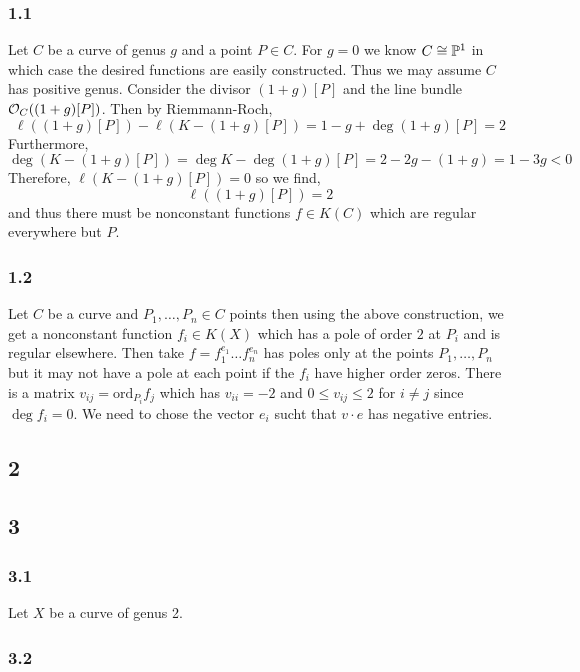 \documentclass[12pt]{article}
\begin{document}
\subsubsection{1.1}

Let $C$ be a curve of genus $g$ and a point $P \in C$. For $g = 0$ we know $C \cong \P^1$ in which case the desired functions are easily constructed. Thus we may assume $C$ has positive genus. Consider the divisor $(1 + g)[P]$ and the line bundle $\struct{C}((1 + g)[P])$. Then by Riemmann-Roch,
\[ \ell((1 + g)[P]) - \ell(K - (1 + g)[P]) = 1 - g + \deg{(1 + g) [P]} = 2 \]
Furthermore,
\[ \deg{(K - (1+g)[P])} = \deg{K} - \deg{(1 + g)[P]} = 2 - 2g - (1 + g) = 1 - 3 g < 0 \]
Therefore, $\ell(K - (1 + g)[P]) = 0$ so we find,
\[ \ell((1 + g)[P]) = 2 \]
and thus there must be nonconstant functions $f \in K(C)$ which are regular everywhere but $P$. 

\subsubsection{1.2}

Let $C$ be a curve and $P_1, \dots, P_n \in C$ points then using the above construction, we get a nonconstant function $f_i \in K(X)$ which has a pole of order $2$ at $P_i$ and is regular elsewhere. Then take $f = f_1^{e_1} \dots f_n^{e_n}$ has poles only at the points $P_1, \dots, P_n$ but it may not have a pole at each point if the $f_i$ have higher order zeros. There is a matrix $v_{ij} = \mathrm{ord}_{P_i} f_j$ which has $v_{ii} = -2$ and $0 \le v_{ij} \le 2$ for $i \neq j$ since $\deg{f_i} = 0$. We need to chose the vector $e_i$ sucht that $v \cdot e$ has negative entries. 

\subsection{2}

\subsection{3}

\subsubsection{3.1}

Let $X$ be a curve of genus 2.

\subsubsection{3.2}
\end{document}
